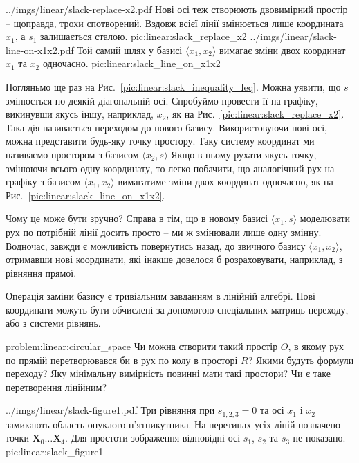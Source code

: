 \documentclass[\main/book.tex]{subfiles}
\begin{document}
\twocolminipage
 {
  \nofigillustration
   {../imgs/linear/slack-replace-x2.pdf}
   {Нові осі теж створюють двовимірний простір -- щоправда, трохи \flqq{}спотворений\frqq. Вздовж всієї лінії змінюється лише координата $x_1$, а $s_1$ залишається сталою.}
   {pic:linear:slack_replace_x2}
 }{
  \nofigillustration
   {../imgs/linear/slack-line-on-x1x2.pdf}
   {Той самий шлях у базисі ${\langle x_1, x_2 \rangle}$ вимагає зміни двох координат $x_1$ та $x_2$ одночасно.}
   {pic:linear:slack_line_on_x1x2}
 }

Погляньмо ще раз на Рис.~\ref{pic:linear:slack_inequality_leq}. Можна уявити, що $s$ змінюється по деякій діагональній осі. Спробуймо провести її на графіку, викинувши якусь іншу, наприклад, $x_2$, як на Рис.~\ref{pic:linear:slack_replace_x2}. Така дія називається \flqq{}переходом до нового базису\frqq. Використовуючи нові осі, можна представити будь-яку точку простору. Таку систему координат ми називаємо \flqq{}простором з базисом ${\langle x_2, s \rangle}$\frqq{} Якщо в ньому рухати якусь точку, змінюючи всього одну координату, то легко побачити, що аналогічний рух на графіку з базисом ${\langle x_1, x_2 \rangle}$ вимагатиме зміни двох координат одночасно, як на Рис.~\ref{pic:linear:slack_line_on_x1x2}.

Чому це може бути зручно? Справа в тім, що в новому базисі ${\langle x_1, s \rangle}$ моделювати рух по потрібній лінії досить просто -- ми ж змінювали лише одну змінну. Водночас, завжди є можливість повернутись назад, до звичного базису ${\langle x_1, x_2 \rangle}$, отримавши нові координати, які інакше довелося б розраховувати, наприклад, з рівняння прямої.

\begin{note}
  Операція заміни базису є тривіальним завданням в лінійній алгебрі. Нові координати можуть бути обчислені за допомогою спеціальних матриць переходу, або з системи рівнянь.
\end{note}

\begin{problem}{problem:linear:circular_space}
 Чи можна створити такий простір $O$, в якому рух по прямій перетворювався би в рух по колу в просторі $R$? Якими будуть формули переходу? Яку мінімальну вимірність повинні мати такі простори? Чи є таке перетворення лінійним?
\end{problem}

\illustration
 {../imgs/linear/slack-figure1.pdf}
 {Три рівняння при $s_{1,2,3}=0$ та осі $x_1$ і $x_2$ замикають область опуклого п'ятникутника. На перетинах усіх ліній позначено точки ${\mathbf{X}_0 \ldots \mathbf{X}_4}$. Для простоти зображення відповідні осі $s_1$, $s_2$ та $s_3$ не показано.}
 {pic:linear:slack_figure1}
\end{document}
